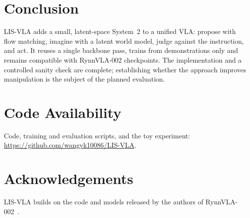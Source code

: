 \documentclass[11pt]{article}
\begin{document}
\section{Conclusion}
LIS-VLA adds a small, latent-space System~2 to a unified VLA: propose with flow matching, imagine with a latent world model, judge against the instruction, and act. It reuses a single backbone pass, trains from demonstrations only and remains compatible with RynnVLA-002 checkpoints. The implementation and a controlled sanity check are complete; establishing whether the approach improves manipulation is the subject of the planned evaluation.

\section*{Code Availability}
Code, training and evaluation scripts, and the toy experiment: \url{https://github.com/wangyk10086/LIS-VLA}.

\section*{Acknowledgements}
LIS-VLA builds on the code and models released by the authors of RynnVLA-002~\citep{cen2025rynnvla002}.



\end{document}
